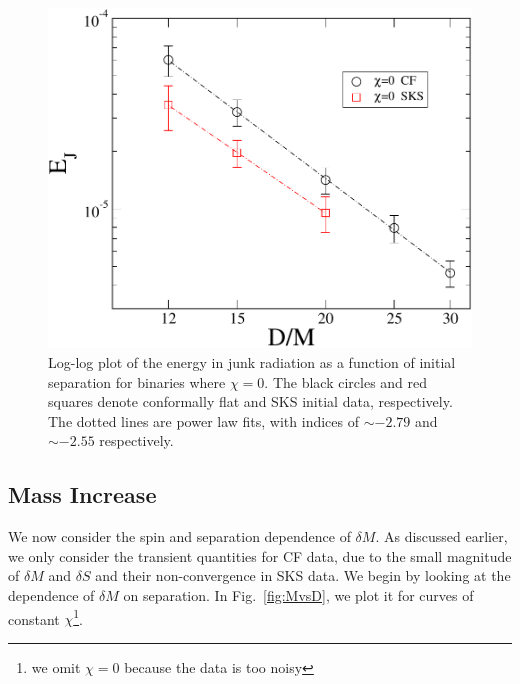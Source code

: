 

\begin{figure}
\includegraphics[scale=0.95]{chap5/EvsD}
 \caption[Log-log plot of $E_J$ vs. $D$.]{Log-log plot of the energy in junk radiation as a function
   of initial separation for binaries where $\chi=0$. The black circles and red squares denote conformally flat and SKS initial
   data, respectively. The dotted lines are
   power law fits, with indices of $\sim -2.79$ and $\sim
   -2.55$ respectively.}
 \label{fig:EvsD}
\end{figure}

\subsection{Mass Increase}
\label{subsec:MassIncrease}
We now consider the spin and separation dependence of $\delta M$.
As discussed earlier, we only consider the transient
quantities for CF data, due to the small magnitude of $\delta M$ and $\delta S$ and their non-convergence in SKS data. We
begin by looking at the dependence of $\delta M$ on
separation. In Fig.~\ref{fig:MvsD}, we plot it for curves of
constant $\chi$\footnote{we omit $\chi=0$ because the data is too
  noisy}. 

